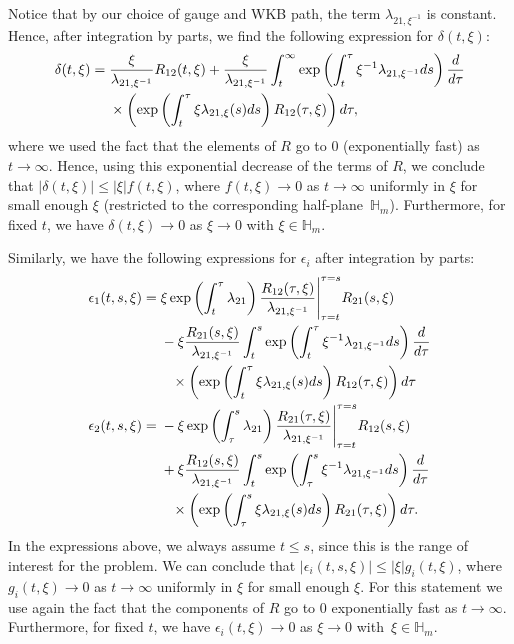 \documentclass[11pt]{article}
\numberwithin{equation}{section}
\numberwithin{equation}{section}
\begin{document}
Notice that by our choice of gauge and WKB path, the term $\lambda_{21,\xi^{-1}}$ is constant. Hence, after integration by parts, we find the following expression for $\delta(t,\xi)$:
\begin{align}
 \delta(t,\xi)={}&\frac{\xi}{{\lambda}_{21,\xi^{-1}}}R_{12}(t,\xi)+ \frac{\xi}{\lambda_{21,\xi^{-1}}} \int_{t}^{\infty}\exp \left(\int_{t}^{\tau}\xi^{-1}\lambda_{21,\xi^{-1}}{\rm d}s\right)\frac{{\rm d}}{{\rm d}\tau} \nonumber\\
 &\times\left(\exp \left(\int_{t}^{\tau}\xi\lambda_{21,\xi}(s){\rm d}s\right)R_{12}(\tau,\xi)\right){\rm d}\tau,\label{est1}
\end{align}
where we used the fact that the elements of $R$ go to $0$ (exponentially fast) as $t\to \infty$.
Hence, using this exponential decrease of the terms of $R$, we conclude that $|\delta(t,\xi)|\leq |\xi|f(t,\xi)$, where $f(t,\xi) \to 0$ as $t \to \infty$ uniformly in $\xi$ for small enough $\xi$ (restricted to the corresponding half-plane~$\mathbb{H}_m$). Furthermore, for fixed $t$, we have $\delta(t,\xi)\to 0$ as $\xi \to 0$ with $\xi \in \mathbb{H}_m$.

Similarly, we have the following expressions for $\epsilon_i$ after integration by parts:
\begin{align}
 \epsilon_1(t,s,\xi)={}& \xi \exp \left(\int_{t}^{\tau}\lambda_{21}\right)\frac{R_{12}(\tau,\xi)}{\lambda_{21,\xi^{-1}}}\Bigg|_{\tau=t}^{\tau=s}R_{21}(s,\xi)\nonumber\\
 &- \xi \frac{R_{21}(s,\xi)}{\lambda_{21,\xi^{-1}}} \int_{t}^{s}\exp \left(\int_{t}^{\tau}\xi^{-1}\lambda_{21,\xi^{-1}}{\rm d}s\right)\frac{{\rm d}}{{\rm d}\tau}\nonumber\\
 &\phantom{- }{}\times\left(\exp \left(\int_{t}^{\tau}\xi\lambda_{21,\xi}(s){\rm d}s\right)R_{12}(\tau,\xi)\right){\rm d}\tau\nonumber\\
 \epsilon_2(t,s,\xi)={}& -\xi \exp \left(\int_{\tau}^{s}\lambda_{21}\right)\frac{R_{21}(\tau,\xi)}{\lambda_{21,\xi^{-1}}}\Bigg|_{\tau=t}^{\tau=s}R_{12}(s,\xi)\nonumber\\
 &+ \xi \frac{R_{12}(s,\xi) }{\lambda_{21,\xi^{-1}}}\int_{t}^{s}\exp \left(\int_{\tau}^{s}\xi^{-1}\lambda_{21,\xi^{-1}}{\rm d}s\right)\frac{{\rm d}}{{\rm d}\tau}\nonumber\\
 &\phantom{+ }{}\times\left(\exp \left(\int_{\tau}^{s}\xi\lambda_{21,\xi}(s){\rm d}s\right)R_{21}(\tau,\xi)\right){\rm d}\tau.\label{est2}
\end{align}
In the expressions above, we always assume $t\leq s$, since this is the range of interest for the problem. We can conclude that $|\epsilon_i(t,s,\xi)|\leq |\xi|g_i(t,\xi)$, where $g_i(t,\xi)\to 0$ as $t \to \infty$ uniformly in $\xi$ for small enough $\xi$. For this statement we use again the fact that the components of $R$ go to $0$ exponentially fast as $t \to \infty$. Furthermore, for fixed $t$, we have $\epsilon_i(t,\xi)\to 0$ as $\xi \to 0$ with~${\xi \in \mathbb{H}_m}$.
\end{document}
